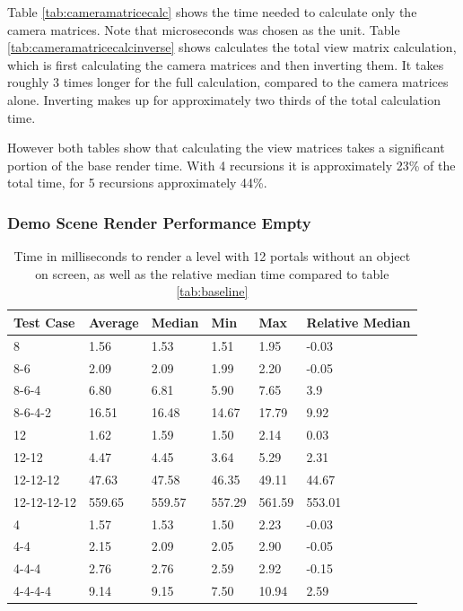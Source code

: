 Table \ref{tab:cameramatricecalc} shows the time needed to calculate only the camera matrices. Note that microseconds was chosen as the unit. Table \ref{tab:cameramatricecalcinverse} shows calculates the total view matrix calculation, which is first calculating the camera matrices and then inverting them. It takes roughly 3 times longer for the full calculation, compared to the camera matrices alone. Inverting makes up for approximately two thirds of the total calculation time.

However both tables show that calculating the view matrices takes a significant portion of the base render time. With 4 recursions it is approximately 23\% of the total time, for 5 recursions approximately 44\%. 

\subsubsection{Demo Scene Render Performance Empty}


\begin{table}[H]
	\centering
	\label{tab:rendernothing}
	\begin{tabular}{|l|l|l|l|l|l|}
		\hline
		Test Case   & Average & Median & Min    & Max    & Relative Median \\ \hline
		8           & 1.56    & 1.53   & 1.51   & 1.95   & -0.03           \\ \hline
		8-6         & 2.09    & 2.09   & 1.99   & 2.20   & -0.05           \\ \hline
		8-6-4       & 6.80    & 6.81   & 5.90   & 7.65   & 3.9             \\ \hline
		8-6-4-2     & 16.51   & 16.48  & 14.67  & 17.79  & 9.92            \\ \hline
		12          & 1.62    & 1.59   & 1.50   & 2.14   & 0.03            \\ \hline
		12-12       & 4.47    & 4.45   & 3.64   & 5.29   & 2.31            \\ \hline
		12-12-12    & 47.63   & 47.58  & 46.35  & 49.11  & 44.67           \\ \hline
		12-12-12-12 & 559.65  & 559.57 & 557.29 & 561.59 & 553.01          \\ \hline
		4           & 1.57    & 1.53   & 1.50   & 2.23   & -0.03           \\ \hline
		4-4         & 2.15    & 2.09   & 2.05   & 2.90   & -0.05           \\ \hline
		4-4-4       & 2.76    & 2.76   & 2.59   & 2.92   & -0.15           \\ \hline
		4-4-4-4     & 9.14    & 9.15   & 7.50   & 10.94  & 2.59            \\ \hline
	\end{tabular}
	\caption{Time in milliseconds to render a level with 12 portals without an object on screen, as well as the relative median time compared to table \ref{tab:baseline}}
\end{table}


